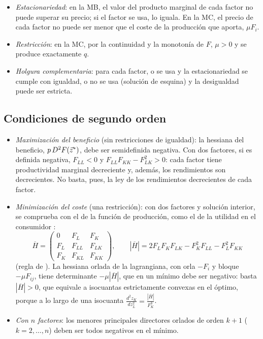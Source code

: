 \documentclass[11pt]{article}
\begin{document}
\begin{itemize}
\item \emph{Estacionariedad}: en la MB, el valor del producto marginal de cada factor no puede superar su precio; si el factor se usa, lo iguala. En la MC, el precio de cada factor no puede ser menor que el coste de la producción que aporta, $\mu F_i$.
\item \emph{Restricción}: en la MC, por la continuidad y la monotonía de $F$, $\mu>0$ y se produce exactamente $q$.
\item \emph{Holgura complementaria}: para cada factor, o se usa y la estacionariedad se cumple con igualdad, o no se usa (solución de esquina) y la desigualdad puede ser estricta.
\end{itemize}

\subsection{Condiciones de segundo orden}\label{anexo:condiciones-segundo-orden}

\begin{itemize}
\item \emph{Maximización del beneficio} (sin restricciones de igualdad): la hessiana del beneficio, $p\,D^2F(\vec{z}^*)$, debe ser semidefinida negativa. Con dos factores, si es definida negativa, $F_{LL}<0$ y $F_{LL}F_{KK}-F_{LK}^2>0$: cada factor tiene productividad marginal decreciente y, además, los rendimientos son decrecientes. No basta, pues, la ley de los rendimientos decrecientes de cada factor.
\item \emph{Minimización del coste} (una restricción): con dos factores y solución interior, se comprueba con el  de la función de producción, como el de la utilidad en el consumidor :
  \begin{equation*}
  \overline{H}=\begin{pmatrix}0&F_L&F_K\\F_L&F_{LL}&F_{LK}\\F_K&F_{KL}&F_{KK}\end{pmatrix},\qquad |\overline{H}|=2F_LF_KF_{LK}-F_K^2F_{LL}-F_L^2F_{KK}
  \end{equation*}
  (regla de ). La hessiana orlada de la lagrangiana, con orla $-F_i$ y bloque $-\mu F_{ij}$, tiene determinante $-\mu|\overline{H}|$, que en un mínimo debe ser negativo: basta $|\overline{H}|>0$, que equivale a isocuantas estrictamente convexas en el óptimo, porque a lo largo de una isocuanta $\frac{d^2z_K}{dz_L^2}=\frac{|\overline{H}|}{F_K^3}$.
\item \emph{Con $n$ factores}: los menores principales directores orlados de orden $k+1$ ($k=2,\dots,n$) deben ser todos negativos en el mínimo\nocite{SydsaeterEtAl2008Further}.
\end{itemize}
\end{document}
